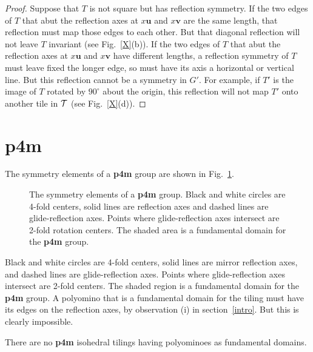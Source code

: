 \documentclass{ws-ijcga}
\begin{document}
\begin{proof}
Suppose that $T$ is not square but has reflection symmetry. 
If the two edges of $T$ that abut the
reflection axes at $x{\mathbf u}$ and $x {\mathbf v}$ are the same length, 
that reflection must map those edges to each other. 
But that diagonal reflection will not leave $T$ invariant (see Fig.~\ref{X}(b)). 
If the two edges of $T$ that abut the reflection axes at $x {\mathbf u}$ and $x {\mathbf v}$ have 
different lengths, a reflection symmetry of $T$
must leave fixed the longer edge, so must have its axis a horizontal or vertical line. 
But this reflection cannot be a symmetry in $G'$. 
For example, if $T'$ is the image of $T$ rotated by $90^\circ$ about
the origin, this reflection will not map $T'$ onto another tile in $\cal T$ (see Fig.~\ref{X}(d)).
\end{proof}














\section{{\bf p4m}}
\label{p4m}
The symmetry elements of a {\bf p4m} group are shown in Fig.~\ref{fig:p4m}.
\begin{figure}[h]
\centerline{
}
\vspace*{8pt}
\caption{
The symmetry elements of a {\bf p4m} group. 
Black and white circles are 4-fold centers, solid lines are reflection
axes and dashed lines are glide-reflection axes. 
Points where glide-reflection axes intersect are 2-fold rotation
centers. The shaded area is a fundamental domain for the {\bf p4m} group.
\label{fig:p4m}
}
\end{figure}
Black and white circles are 4-fold centers, solid lines are mirror reflection axes, 
and dashed lines are glide-reflection axes. Points
where glide-reflection axes intersect are 2-fold centers. The shaded region is a fundamental
domain for the {\bf p4m} group. A polyomino that is a fundamental domain for the tiling must have
its edges on the reflection axes, by observation (i) in section~\ref{intro}. 
But this is clearly impossible.

\begin{theorem}
There are no {\bf p4m} isohedral tilings having polyominoes as fundamental domains.
\end{theorem}
\end{document}
